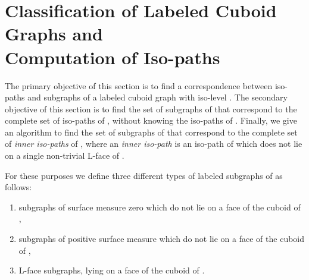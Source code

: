\documentclass[a4paper,11pt]{article}
\begin{document}
\section{Classification of Labeled Cuboid Graphs and\\ Computation of Iso-paths}
The primary objective of this section is to find a correspondence between iso-paths and subgraphs
of a labeled cuboid graph  with iso-level . The secondary objective
of this section is to find the set of subgraphs of  that correspond to the complete set of iso-paths
of , without knowing the iso-paths of . Finally, we give an algorithm to find the set of subgraphs
of  that correspond to the complete set of {\it inner iso-paths} of , where an {\it inner iso-path}
is  an iso-path of  which does not lie on a single non-trivial L-face of .

For these purposes we define three different types of labeled subgraphs of  as follows:
\begin{enumerate}
\item subgraphs of surface measure zero which do not lie on a face of the cuboid of ,
\item subgraphs of positive surface measure which do not lie on a face of the cuboid of ,
\item L-face subgraphs, lying on a face of the cuboid of .
\end{enumerate}
\end{document}
